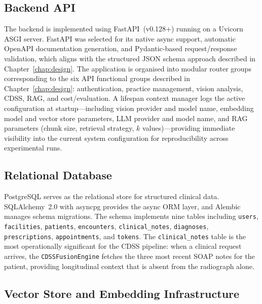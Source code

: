 \documentclass[12pt,a4paper]{report}
\begin{document}
	\subsection{Backend API}
	\label{subsec:backend}
	
	The backend is implemented using FastAPI~(v0.128+) running on a Uvicorn
	ASGI server.  FastAPI was selected for its native async support,
	automatic OpenAPI documentation generation, and Pydantic-based
	request/response validation, which aligns with the structured JSON
	schema approach described in Chapter~\ref{chap:design}.  The application is
	organised into modular router groups corresponding to the six API
	functional groups described in Chapter~\ref{chap:design}: authentication,
	practice management, vision analysis, CDSS, RAG, and cost/evaluation.
	A lifespan context manager logs the active configuration at startup---including
	vision provider and model name, embedding model and vector store
	parameters, LLM provider and model name, and RAG parameters (chunk
	size, retrieval strategy, $k$ values)---providing immediate visibility
	into the current system configuration for reproducibility across
	experimental runs.
	
	\subsection{Relational Database}
	\label{subsec:db}
	
	PostgreSQL serves as the relational store for structured clinical data.
	SQLAlchemy~2.0 with asyncpg provides the async ORM layer, and Alembic
	manages schema migrations.  The schema implements nine tables including
	\texttt{users}, \texttt{facilities}, \texttt{patients},
	\texttt{encounters}, \texttt{clinical\_notes}, \texttt{diagnoses},
	\texttt{prescriptions}, \texttt{appointments}, and \texttt{tokens}.  The
	\texttt{clinical\_notes} table is the most operationally significant for
	the CDSS pipeline: when a clinical request arrives, the
	\texttt{CDSSFusionEngine} fetches the three most recent SOAP notes for
	the patient, providing longitudinal context that is absent from the
	radiograph alone.
	
	\subsection{Vector Store and Embedding Infrastructure}
	\label{subsec:vector}
	
\end{document}
